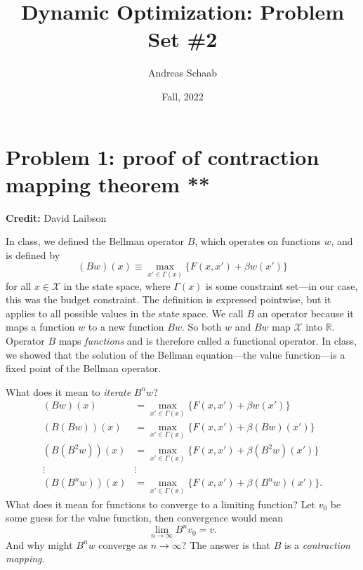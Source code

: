 \documentclass[11pt]{extarticle}
\title{Dynamic Optimization: Problem Set \#2}
\author{Andreas Schaab}
\date{Fall, 2022}
\theoremstyle{plain}
\theoremstyle{definition}
\begin{document}
\maketitle
\thispagestyle{empty}
\setcounter{page}{0}


\vspace{10mm}
\section*{Problem 1: proof of contraction mapping theorem **}

\textbf{Credit:} David Laibson


\vspace{5mm}
\noindent
In class, we defined the Bellman operator $B$, which operates on functions $w$, and is defined by
\begin{equation*}
	(Bw)(x) \equiv \max_{x' \in \Gamma(x)} \bigg\{ F(x, x') + \beta w(x') \bigg\}
\end{equation*}
for all $x \in \mathcal X$ in the state space, where $\Gamma(x)$ is some constraint set---in our case, this was the budget constraint. The definition is expressed pointwise, but it applies to all possible values in the state space. We call $B$ an operator because it maps a function $w$ to a new function $Bw$. So both $w$ and $Bw$ map $\mathcal X$ into $\mathbb R$. Operator $B$ maps \textit{functions} and is therefore called a functional operator. In class, we showed that the solution of the Bellman equation---the value function---is a fixed point of the Bellman operator.

What does it mean to \textit{iterate} $B^n w$?
\begin{align*}
	(Bw) (x) &= \max_{x' \in \Gamma(x)} \bigg\{ F(x, x') + \beta w(x') \bigg\} \\
	(B(Bw)) (x) &= \max_{x' \in \Gamma(x)} \bigg\{ F(x, x') + \beta (Bw)(x') \bigg\} \\
	(B(B^2w)) (x) &= \max_{x' \in \Gamma(x)} \bigg\{ F(x, x') + \beta (B^2w)(x') \bigg\} \\
	\vdots & \vdots  \\
	(B(B^nw)) (x) &= \max_{x' \in \Gamma(x)} \bigg\{ F(x, x') + \beta (B^nw)(x') \bigg\}.
\end{align*}
What does it mean for functions to converge to a limiting function? Let $v_0$ be some guess for the value function, then convergence would mean
\begin{equation*}
	\lim_{n \to \infty} B^n v_0 = v.
\end{equation*}
And why might $B^n w$ converge as $n \to \infty$? The answer is that $B$ is a \textit{contraction mapping}.
\end{document}
